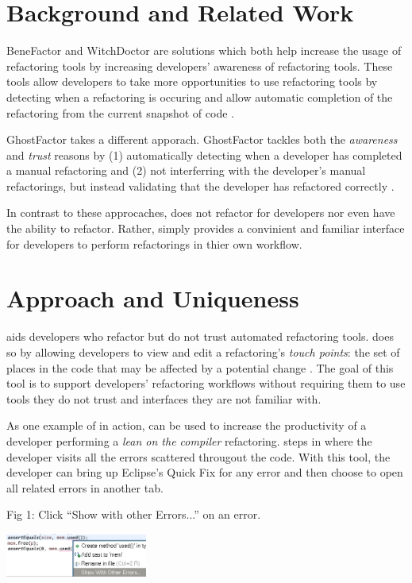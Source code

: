 \documentclass{sigplanconf}
\begin{document}
\section{Background and Related Work}
BeneFactor \cite{bene-factor} and WitchDoctor \cite{witch-doctor} are solutions
which both help increase the usage of refactoring tools by increasing 
developers' awareness of refactoring tools. These tools allow developers 
to take more opportunities to use refactoring tools by
detecting when a refactoring is occuring and
allow automatic completion of the refactoring from the current snapshot of code
\cite{bene-factor, witch-doctor}.

GhostFactor takes a different apporach. GhostFactor tackles both the
\textit{awareness} and \textit{trust} reasons by (1) automatically detecting
when a developer has completed a manual refactoring and (2) not
interferring with the developer's manual
refactorings, but instead validating that the developer has refactored
correctly \cite{ghost-factor}.

In contrast to these approcaches, \pname{} does not refactor
for developers nor even have the ability to refactor. Rather, \pname{} simply
provides a
convinient and familiar interface for developers to perform refactorings in
thier own workflow.

\section{Approach and Uniqueness}
\pname{} aids developers who refactor but do not trust
automated refactoring tools. \pname{} does so by allowing
developers to view and edit a refactoring's \textit{touch points}:
the set of places in the code that may be affected by a potential change
\cite{how-refactor}. The goal of this tool is to support
developers' refactoring workflows without requiring them to use tools they do
not trust and interfaces they are not familiar with.

As one example of \pname{} in action, \pname{} can be used to increase the
productivity of a developer performing a \textit{lean on the compiler}
refactoring.
\pname{} steps in where the developer visits all the errors scattered througout
the code. With this tool, the developer can bring up Eclipse's Quick Fix for
any error and then choose to open all related errors in another tab.
\begin{center}
\caption*{Fig 1: Click ``Show with other Errors...'' on an error.}
\includegraphics[width=0.35\textwidth]{quick-fix.png}
\end{center}
\end{document}
